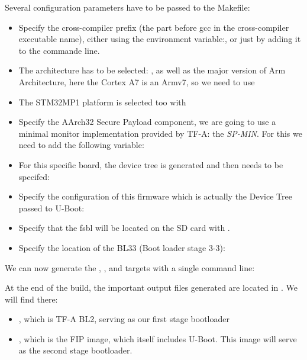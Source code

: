 Several configuration parameters have to be passed to the Makefile:
\begin{itemize}
\item Specify the cross-compiler prefix (the part before gcc in the
      cross-compiler executable name), either using the environment
      variable:, or just by
      adding it to the  commande line.
\item The architecture has to be selected: , as
      well as the major version of Arm Architecture, here the Cortex A7 is
      an Armv7, so we need to use 
\item The STM32MP1 platform is selected too with 
\item Specify the AArch32 Secure Payload component, we are going to
      use a minimal monitor implementation provided by TF-A: the
      {\em SP-MIN}. For this we need to add the following variable:
\item For this specific board, the device tree is generated and then
      needs to be specifed: 
\item Specify the configuration of this firmware which is actually
      the Device Tree passed to U-Boot:
\item Specify that the fsbl will be located on the SD
      card with .
\item Specify the location of the BL33 (Boot loader stage 3-3):
\end{itemize}

We can now generate the , , and  targets
with a single command line:

At the end of the build, the important output files generated are
located in . We will find there:

\begin{itemize}

\item {}, which is TF-A BL2, serving as
  our first stage bootloader

\item {}, which is the FIP image, which itself includes
  U-Boot. This image will serve as the second stage bootloader.

\end{itemize}

